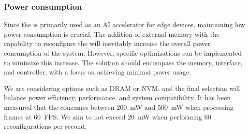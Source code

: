 \subsubsection{Power consumption}
Since the \graicore{} is primarily used as an AI accelerator for edge devices, maintaining low power consumption is crucial.
The addition of external memory with the capability to reconfigure the \graicore{} will inevitably increase the overall power consumption of the system.
However, specific optimizations can be implemented to minimize this increase.
The solution should encompass the memory, interface, and controller, with a focus on achieving minimal power usage.

We are considering options such as DRAM or NVM, and the final selection will balance power efficiency, performance, and system compatibility.
It has been measured that the \graicore{} consumes between \SI{200}{mW} and \SI{500}{mW} when processing frames at \SI{60}{FPS}.
We aim to not exceed \SI{20}{mW} when performing 60 reconfigurations per second.
